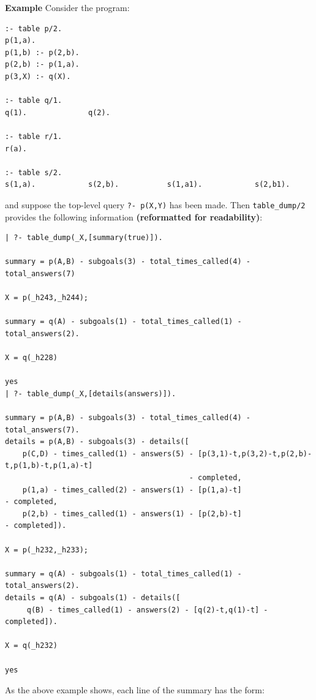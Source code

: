 \begin{description}
{\bf Example}  Consider the program:
\begin{verbatim}
:- table p/2.
p(1,a).
p(1,b) :- p(2,b).
p(2,b) :- p(1,a).
p(3,X) :- q(X).

:- table q/1.
q(1).              q(2).

:- table r/1.
r(a).

:- table s/2.
s(1,a).            s(2,b).           s(1,a1).            s(2,b1).
\end{verbatim}
and suppose the top-level query {\tt ?- p(X,Y)} has been made.  Then
{\tt table\_dump/2} provides the following information {\bf
 (reformatted for readability)}:
%
{\small
\begin{verbatim}
| ?- table_dump(_X,[summary(true)]).

summary = p(A,B) - subgoals(3) - total_times_called(4) - total_answers(7)

X = p(_h243,_h244);

summary = q(A) - subgoals(1) - total_times_called(1) - total_answers(2).

X = q(_h228)

yes
| ?- table_dump(_X,[details(answers)]).

summary = p(A,B) - subgoals(3) - total_times_called(4) - total_answers(7).
details = p(A,B) - subgoals(3) - details([
    p(C,D) - times_called(1) - answers(5) - [p(3,1)-t,p(3,2)-t,p(2,b)-t,p(1,b)-t,p(1,a)-t] 
                                          - completed,
    p(1,a) - times_called(2) - answers(1) - [p(1,a)-t]                         - completed,
    p(2,b) - times_called(1) - answers(1) - [p(2,b)-t]                         - completed]).

X = p(_h232,_h233);

summary = q(A) - subgoals(1) - total_times_called(1) - total_answers(2).
details = q(A) - subgoals(1) - details([
     q(B) - times_called(1) - answers(2) - [q(2)-t,q(1)-t] - completed]).

X = q(_h232)

yes
\end{verbatim}
}

As the above example shows, each line of the summary has the form:


\end{description}
